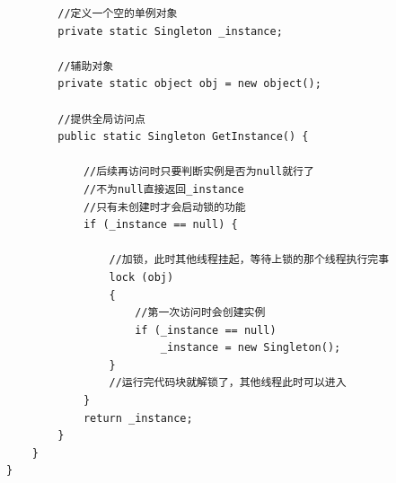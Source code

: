\documentclass[9pt, b5paper]{article}
\begin{document}
\begin{enumerate}
\begin{enumerate}
\begin{itemize}
\begin{verbatim}
        //定义一个空的单例对象
        private static Singleton _instance;
        
        //辅助对象
        private static object obj = new object();
        
        //提供全局访问点
        public static Singleton GetInstance() {
            
            //后续再访问时只要判断实例是否为null就行了
            //不为null直接返回_instance
            //只有未创建时才会启动锁的功能
            if (_instance == null) {
                
                //加锁，此时其他线程挂起，等待上锁的那个线程执行完事
                lock (obj)
                {
                    //第一次访问时会创建实例
                    if (_instance == null)
                        _instance = new Singleton();
                }
                //运行完代码块就解锁了，其他线程此时可以进入
            }
            return _instance;
        }
    }
}
\end{verbatim}
\end{itemize}
\end{enumerate}
\end{enumerate}
\end{document}
